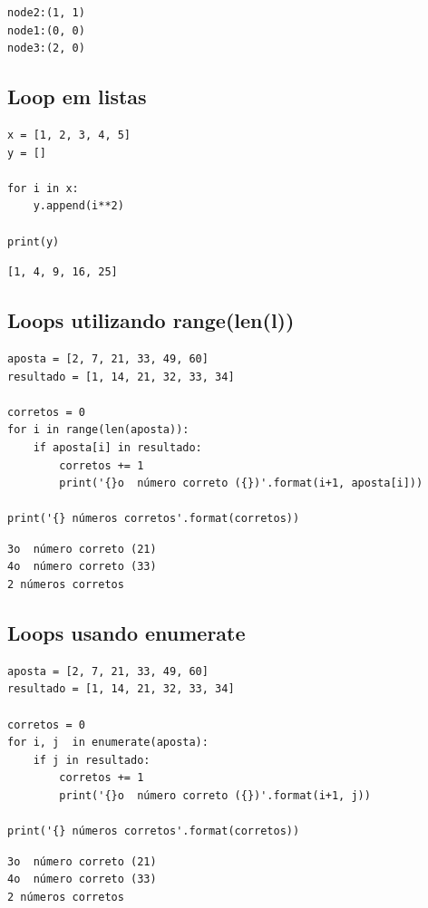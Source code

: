 \documentclass[presentation]{beamer}
\begin{document}
\begin{verbatim}
node2:(1, 1)
node1:(0, 0)
node3:(2, 0)
\end{verbatim}

\subsection{Loop em listas}
\label{sec:orgheadline84}
\begin{verbatim}
x = [1, 2, 3, 4, 5]
y = []

for i in x:
    y.append(i**2)

print(y)
\end{verbatim}

\begin{verbatim}
[1, 4, 9, 16, 25]
\end{verbatim}
\subsection{Loops utilizando range(len(l))}
\label{sec:orgheadline85}
\begin{verbatim}
aposta = [2, 7, 21, 33, 49, 60]
resultado = [1, 14, 21, 32, 33, 34]

corretos = 0
for i in range(len(aposta)):
    if aposta[i] in resultado:
        corretos += 1
        print('{}o  número correto ({})'.format(i+1, aposta[i]))

print('{} números corretos'.format(corretos))
\end{verbatim}

\begin{verbatim}
3o  número correto (21)
4o  número correto (33)
2 números corretos
\end{verbatim}
\subsection{Loops usando enumerate}
\label{sec:orgheadline86}
\begin{verbatim}
aposta = [2, 7, 21, 33, 49, 60]
resultado = [1, 14, 21, 32, 33, 34]

corretos = 0
for i, j  in enumerate(aposta):
    if j in resultado:
        corretos += 1
        print('{}o  número correto ({})'.format(i+1, j))

print('{} números corretos'.format(corretos))
\end{verbatim}

\begin{verbatim}
3o  número correto (21)
4o  número correto (33)
2 números corretos
\end{verbatim}
\end{document}
